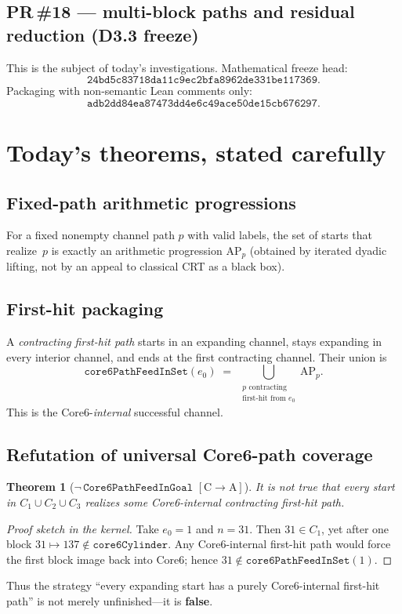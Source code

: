 \documentclass[11pt,a4paper]{article}
\newtheorem{theorem}{Theorem}
\theoremstyle{definition}
\theoremstyle{remark}
\newcommand{\CA}{\ensuremath{[\mathrm{C}\!\to\!\mathrm{A}]}}
\newcommand{\FeedIn}{\mathtt{core6PathFeedInSet}}
\begin{document}
\subsection{PR\,\#18 --- multi-block paths and residual reduction (D3.3 freeze)}
This is the subject of today's investigations.
Mathematical freeze head:
\[
  \texttt{24bd5c83718da11c9ec2bfa8962de331be117369}.
\]
Packaging with non-semantic Lean comments only:
\[
  \texttt{adb2dd84ea87473dd4e6c49ace50de15cb676297}.
\]

\section{Today's theorems, stated carefully}

\subsection{Fixed-path arithmetic progressions}
For a fixed nonempty channel path $p$ with valid labels, the set of starts
that realize~$p$ is exactly an arithmetic progression $\mathrm{AP}_p$
(obtained by iterated dyadic lifting, not by an appeal to classical CRT as a
black box).

\subsection{First-hit packaging}
A \emph{contracting first-hit path} starts in an expanding channel, stays
expanding in every interior channel, and ends at the first contracting
channel.
Their union is
\[
  \FeedIn(e_0)
  \;=\;
  \bigcup_{\substack{p\text{ contracting}\\\text{first-hit from }e_0}}
  \mathrm{AP}_p.
\]
This is the Core6-\emph{internal} successful channel.

\subsection{Refutation of universal Core6-path coverage}
\begin{theorem}[$\neg\,\mathtt{Core6PathFeedInGoal}$ \CA]
It is not true that every start in $C_1\cup C_2\cup C_3$ realizes some
Core6-internal contracting first-hit path.
\end{theorem}
\begin{proof}[Proof sketch in the kernel]
Take $e_0=1$ and $n=31$.
Then $31\in C_1$, yet after one block $31\mapsto 137\notin\mathtt{core6Cylinder}$.
Any Core6-internal first-hit path would force the first block image back into
Core6; hence $31\notin\FeedIn(1)$.
\end{proof}
Thus the strategy
``every expanding start has a purely Core6-internal first-hit path''
is not merely unfinished---it is \textbf{false}.
\end{document}
